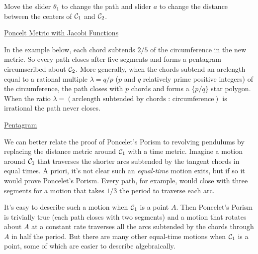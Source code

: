 \documentclass{ximera}
\begin{document}
\begin{exploration}
Move the slider $\theta_1$ to change the path and slider $a$ to change the distance between the centers of ${\cal C}_1$ and ${\cal C}_2$.
 
\begin{onlineOnly}
    \begin{center}
\end{center}
\end{onlineOnly}

\href{https://www.desmos.com/calculator/wzctareiln}{Poncelt Metric with Jacobi Functions}

\end{exploration}

In the example below, each chord subtends $2/5$ of the circumference in the new metric. So every path closes after five segments and forms a pentagram circumscribed about ${\cal C}_2$. More generally, when the chords subtend an arclength equal to a rational multiple $\lambda = q/p$ ($p$ and $q$ relatively prime positive integers) of the circumference, the path closes with $p$ chords and forms a $\{p/q \}$ star polygon. When the ratio $\lambda = (\text{arclength subtended by chords : circumference})$ is irrational the path never closes.

\begin{exploration}
\begin{onlineOnly}
    \begin{center}
\end{center}
\end{onlineOnly}

\href{https://www.desmos.com/calculator/qco4rghhfi}{Pentagram}

\end{exploration}

We can better relate the proof of Poncelet's Porism to revolving pendulums by replacing the distance metric around ${\cal C}_1$ with a time metric. Imagine a motion around ${\cal C}_1$ that traverses the shorter arcs subtended by the tangent chords in equal times. A priori, it's not clear such an \emph{equal-time} motion exits, but if so it would prove Poncelet's Porism. Every path, for example, would close with three segments for a motion that takes $1/3$ the period to traverse each arc. %

It's easy to describe such a motion when ${\cal C}_1$ is a point $A$. Then Poncelet's Porism is trivially true (each path closes with two segments) and a motion that rotates about $A$ at a constant rate traverses all the arcs subtended by the chords through $A$ in half the period. But there are many other equal-time motions when ${\cal C}_1$ is a point, some of which are easier to describe algebraically. 
\end{document}
